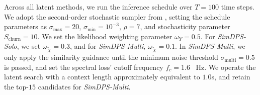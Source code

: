 \documentclass{article}
\begin{document}
Across all latent methods, we run the inference schedule over $T=100$ time steps. 
We adopt the second-order stochastic sampler from \cite{karras2022elucidating}, setting the schedule parameters as $\sigma_\mathrm{max} = 20$,  $\sigma_\mathrm{min} = 10^{-3}$,  $\rho=7$, 
and stochasticity parameter $S_\mathrm{churn}=10$.
We set the likelihood weighting parameter $\omega_Y=0.5$. 
For \textit{SimDPS-Solo}, we set $\omega_{\tilde{X}} = 0.3$, and for \textit{SimDPS-Multi}, $\omega_{\tilde{X}} = 0.1$. 
In \textit{SimDPS-Multi}, 
we only apply the similarity guidance until the minimum noise threshold $\sigma_\mathrm{multi}=0.5$ is passed, and set the spectral loss' cutoff frequency $f_c = 1.6$ \, Hz.
We operate the latent search with a context length approximately equivalent to $1.0$s, and retain the top-$15$ candidates for \textit{SimDPS-Multi}.



\end{document}
